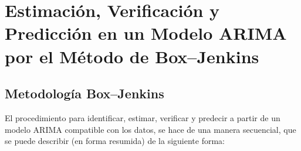 \chapter[Estimaci\'{o}n, Verificaci\'{o}n y Predicci\'{o}n en un Modelo ARIMA]{Estimaci\'{o}n, Verificaci\'{o}n y Predicci\'{o}n en un Modelo ARIMA por el  M\'{e}todo de Box--Jenkins}

\section{Metodolog\'{i}a Box--Jenkins}


El procedimiento para  identificar, 
estimar, verificar y predecir a partir de un modelo ARIMA compatible con los 
datos, se hace de una manera secuencial, que se puede describir (en forma 
resumida) de la siguiente forma:

